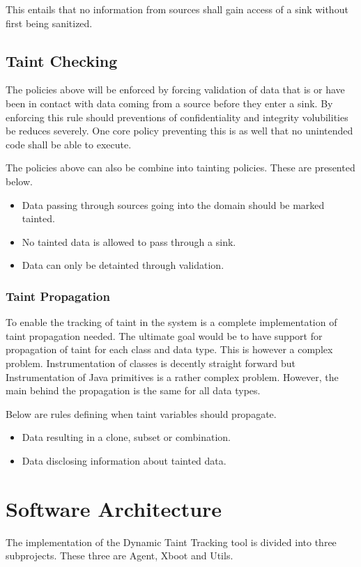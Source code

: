 This entails that no information from sources shall gain access of a sink without first being sanitized.


\subsection{Taint Checking}
The policies above will be enforced by forcing validation of data that is or have been in contact with data coming from a source before they enter a sink. By enforcing this rule should preventions of confidentiality and integrity volubilities be reduces severely. One core policy preventing this is as well that no unintended code shall be able to execute.

The policies above can also be combine into tainting policies. These are presented below.

\hfill
\begin{itemize}
	\item Data passing through sources going into the domain should be marked tainted.
	\item No tainted data is allowed to pass through a sink.
	\item Data can only be detainted through validation.
\end{itemize}
\hfill


\subsubsection{Taint Propagation}
To enable the tracking of taint in the system is a complete implementation of taint propagation needed. The ultimate goal would be to have support for propagation of taint for each class and data type. This is however a complex problem. Instrumentation of classes is decently straight forward but Instrumentation of Java primitives is a rather complex problem. However, the main behind the propagation is the same for all data types. 

Below are rules defining when taint variables should propagate.

\hfill
\begin{itemize}
	\item Data resulting in a clone, subset or combination.
	\item Data disclosing information about tainted data.
\end{itemize}
\hfill


\section{Software Architecture}
\label{SoftwareArchitecture}
The implementation of the Dynamic Taint Tracking tool is divided into three subprojects. These three are Agent, Xboot and Utils. 

